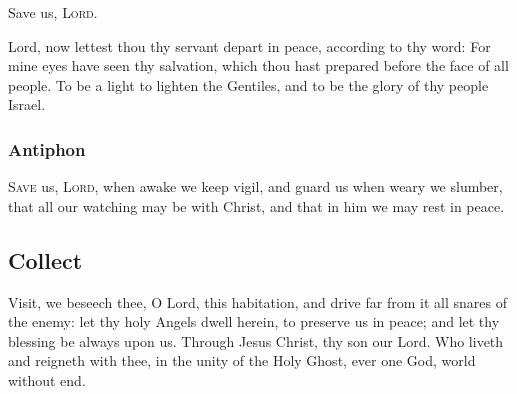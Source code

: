 \documentclass{article}
\begin{document}

Save us, \textsc{Lord}.


\begin{prayer}

  Lord, now lettest thou thy servant depart in peace,
    according to thy word:
  For mine eyes have seen thy salvation,
    which thou hast prepared before the face of all people.
  To be a light to lighten the Gentiles,
    and to be the glory of thy people Israel.
\end{prayer}
\blankline
\begin{responses}

    
\end{responses}

\subsubsection*{Antiphon}

\textsc{Save} us, \textsc{Lord}, when awake we keep vigil, and guard us when weary we slumber,
that all our watching may be with Christ, and that in him we may rest in peace.

\subsection*{Collect}


\begin{responses}

    
\end{responses}

Visit, we beseech thee, O Lord, this habitation, and drive far from it all snares of the enemy: let thy holy Angels dwell herein, to preserve us in peace; and let thy blessing be always upon us. Through Jesus Christ, thy son our Lord. Who liveth and reigneth with thee, in the unity of the Holy Ghost, ever one God, world without end.
\end{document}
